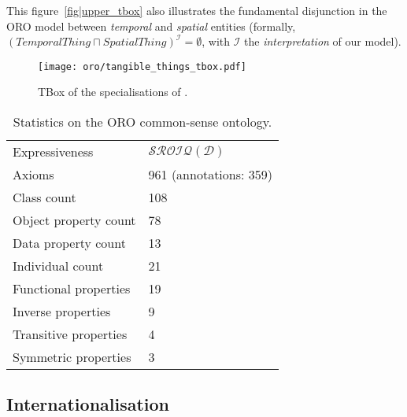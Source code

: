 This figure~\ref{fig|upper_tbox} also illustrates the fundamental disjunction
in the ORO model between \emph{temporal} and \emph{spatial} entities (formally,
$(TemporalThing \sqcap SpatialThing)^{\mathcal{I}} = \emptyset$, with
$\mathcal{I}$ the \emph{interpretation} of our model).



\begin{figure}
    \centering
    \texttt{[image: oro/tangible\_things\_tbox.pdf]}
    \caption{TBox of the specialisations of .}
    \label{fig|tangible_things_tbox}
\end{figure}


\begin{table}
\begin{center}

\begin{tabular}{ll}
\toprule
Expressiveness & $\mathcal{SROIQ(D)}$ \\
Axioms & 961 (annotations: 359)\\
Class count & 108 \\
Object property count & 78 \\
Data property count & 13 \\
Individual count & 21 \\
Functional properties & 19 \\
Inverse properties & 9 \\
Transitive properties & 4 \\
Symmetric properties & 3 \\
\bottomrule

\end{tabular}
\end{center}

\caption{Statistics on the ORO common-sense ontology.}

\label{table|onto-stats}
\end{table}


\subsection{Internationalisation}
\label{sect|commonsense-i13n}

